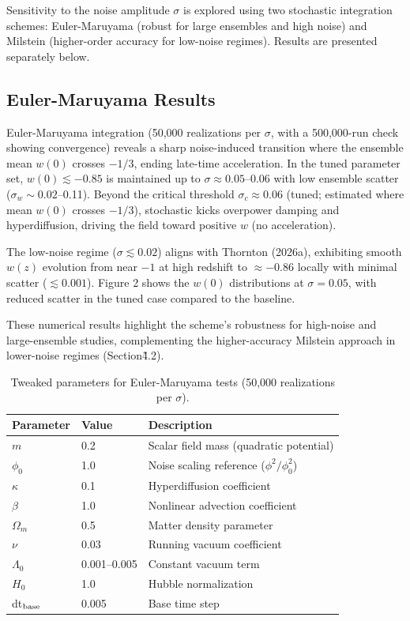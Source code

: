 \documentclass[preprint]{aastex7}
\begin{document}
Sensitivity to the noise amplitude \( \sigma \) is explored using two stochastic integration schemes: Euler-Maruyama (robust for large ensembles and high noise) and Milstein (higher-order accuracy for low-noise regimes). Results are presented separately below.

\subsection{Euler-Maruyama Results}

Euler-Maruyama integration (50,000 realizations per \( \sigma \), with a 500,000-run check showing convergence) reveals a sharp noise-induced transition where the ensemble mean \( w(0) \) crosses \( -1/3 \), ending late-time acceleration. In the tuned parameter set, \( w(0) \lesssim -0.85 \) is maintained up to \( \sigma \approx 0.05 \)--0.06 with low ensemble scatter (\( \sigma_w \sim 0.02 \)--0.11). Beyond the critical threshold \( \sigma_c \approx 0.06 \) (tuned; estimated where mean \( w(0) \) crosses \( -1/3 \)), stochastic kicks overpower damping and hyperdiffusion, driving the field toward positive \( w \) (no acceleration).

The low-noise regime (\( \sigma \lesssim 0.02 \)) aligns with Thornton (2026a), exhibiting smooth \( w(z) \) evolution from near \( -1 \) at high redshift to \( \approx -0.86 \) locally with minimal scatter (\( \lesssim 0.001 \)). Figure 2 shows the \( w(0) \) distributions at \( \sigma = 0.05 \), with reduced scatter in the tuned case compared to the baseline.

These numerical results highlight the scheme's robustness for high-noise and large-ensemble studies, complementing the higher-accuracy Milstein approach in lower-noise regimes (Section\~4.2).

\begin{table}[htbp]
\centering
\caption{Tweaked parameters for Euler-Maruyama tests (50,000 realizations per \( \sigma \)).}
\label{tab:em-tuned-params}
\begin{tabular}{l l l}
\hline
Parameter & Value & Description \\
\hline
\( m \) & 0.2 & Scalar field mass (quadratic potential) \\
\( \phi_0 \) & 1.0 & Noise scaling reference (\( \phi^2 / \phi_0^2 \)) \\
\( \kappa \) & 0.1 & Hyperdiffusion coefficient \\
\( \beta \) & 1.0 & Nonlinear advection coefficient \\
\( \Omega_m \) & 0.5 & Matter density parameter \\
\( \nu \) & 0.03 & Running vacuum coefficient \\
\( \Lambda_0 \) & 0.001--0.005 & Constant vacuum term \\
\( H_0 \) & 1.0 & Hubble normalization \\
dt\( _{\rm base} \) & 0.005 & Base time step \\
\hline
\end{tabular}
\end{table}
\end{document}
